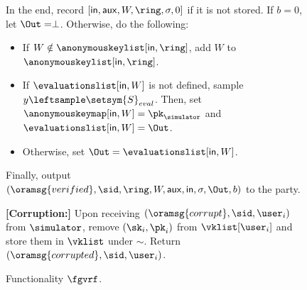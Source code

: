 \begin{figure}
\begin{tcolorbox}[left=2pt,right=2pt]
{\begin{list}{\hspace*{1pt} C}{\setlength\leftmargin{0.15in}}
				\end{list}
				\vspace{-.7mm}
				In the end,  record $ [\msg,\aux,W,\ring,\sigma, 0] $ if it is not stored. If $ b = 0 $, let $\Out= \perp $. Otherwise,   do the following:
				\begin{itemize}
					\item If $ W \notin \anonymouskeylist[\msg,\ring] $, add $ W $ to $ \anonymouskeylist[\msg,\ring]  $.
					\item If $ \evaluationslist[\msg,W] $ is not defined, sample $ y \leftsample \setsym{S}_{eval}$. Then, set $ \anonymouskeymap[\msg,W]  = \pk_\simulator$ and $ \evaluationslist[\msg, W] = \Out$.
					\item Otherwise, set $ \Out = \evaluationslist[\msg, W]$. 	
				\end{itemize}
				\vspace{-.7mm}
				Finally, output $(\oramsg{verified}, \sid, \ring,W, \aux,\msg, \sigma, \Out, b)$ to the party.
				
				
				\textbf{[Corruption:]} 
				Upon receiving $ (\oramsg{corrupt}, \sid, \user_i) $ from $ \simulator $, remove $ (\sk_i,\pk_i) $ from $ \vklist[\user_i] $ and store them in $ \vklist $ under $ \sim $. Return $ (\oramsg{corrupted}, \sid,\user_i) $.
			}
		\end{tcolorbox}
		\vspace{-3mm}
		\caption{Functionality $\fgvrf$.\label{f:gvrf}}
	\end{figure}

